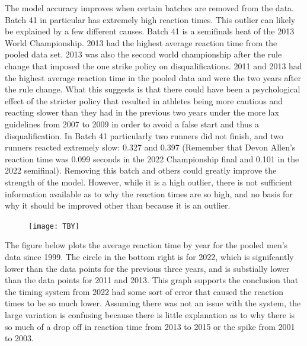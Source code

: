 \documentclass[12pt, letterpaper, titlepage]{article}
\begin{document}
The model accuracy improves when certain batches are removed from the data.  Batch 41 in
particular has extremely high reaction times.  This outlier can likely be explained by a
few different causes.  Batch 41 is a semifinals heat of the 2013 World Championship.  2013 had the highest average reaction time from the pooled data set.  2013 was also the second world championship after the rule change that imposed the one strike policy on
disqualifications. 2011 and 2013 had the highest average reaction time in the pooled
data and were the two years after the rule change.  What this suggests is that there could have been a psychological effect of the stricter policy that resulted in athletes being more cautious and reacting slower than they had in the previous two years under the more lax guidelines from 2007 to 2009 in order to avoid a false start and thus a disqualification.
In Batch 41 particularly two runners did not finish, and two runners reacted extremely slow: 0.327 and 0.397 (Remember that Devon Allen's reaction time was
0.099 seconds in the 2022 Championship final and 0.101 in the 2022 semifinal).  Removing this batch and others could greatly improve the strength of the model.  However, while
it is a high outlier, there is not sufficient information available as to why the
reaction times are so high, and no basis for why it should be improved other than because
it is an outlier.

\begin{figure}[h]
  \centering 
  \texttt{[image: TBY]}
  \label{fig:TBY}
\end{figure}

The figure below plots the average reaction time by year for the pooled men's data since
1999.  The circle in the bottom right is for 2022, which is signifcantly lower than the
data points for the previous three years, and is substially lower than the data points
for 2011 and 2013.  This graph supports the conclusion that the timing system from 2022
had some sort of error that caused the reaction times to be so much lower.  Assuming there
was not an issue with the system, the large variation is confusing because there is little explanation
as to why there is so much of a drop off in reaction time from 2013 to 2015 or the spike
from 2001 to 2003.
\end{document}
